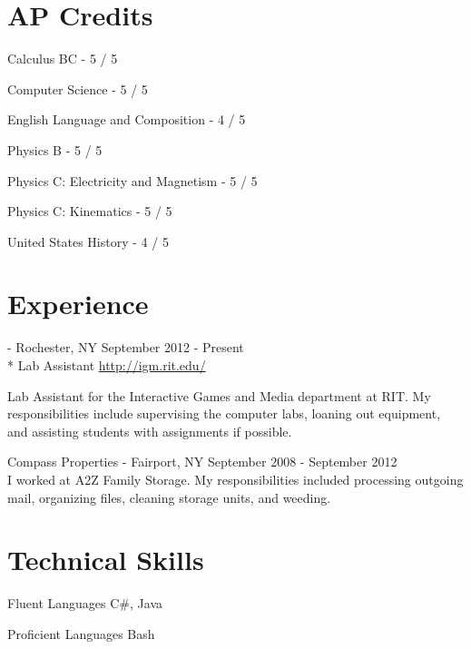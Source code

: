 \documentclass[letterpaper,margin,line,11pt]{resume}
\newcommand{\rurl}[1]{\hfill {\footnotesize \url{#1}}}
\newcommand{\rdate}[1]{\hfill {\small #1}}
\renewcommand{\employer}[5]{\item[#1] - #2 \rdate{#3} \\* #4 \rurl{#5}}
\begin{document}
\begin{resume}
\section{\mysidestyle AP Credits}
        \begin{compactitem}
                \item Calculus BC - {\small 5 / 5}
                \item Computer Science - {\small 5 / 5}
                \item English Language and Composition - {\small 4 / 5}
                \item Physics B - {\small 5 / 5}
                \item Physics C: Electricity and Magnetism - {\small 5 / 5}
                \item Physics C: Kinematics - {\small 5 / 5}
                \item United States History - {\small 4 / 5}
        \end{compactitem}
\section{\mysidestyle Experience}
	\begin{asparadesc}
		\employer{Interactive Games and Media at RIT}{Rochester, NY}{September 2012 - Present}{Lab Assistant}{http://igm.rit.edu/}

		\small
		Lab Assistant for the Interactive Games and Media department at RIT. My responsibilities include supervising the computer labs, loaning out equipment, and assisting students with assignments if possible.
		\normalsize
		\\
		\item[Compass Properties] - Fairport, NY \hfill September 2008 - September 2012 \\
		\small
                I worked at A2Z Family Storage. My responsibilities included processing outgoing mail, organizing files, cleaning storage units, and weeding.
		

	\end{asparadesc}

\section{\mysidestyle Technical Skills}
	\begin{compactdesc}
		\item[Fluent Languages]   \small C\#, Java
		\item[Proficient Languages] \small Bash
	\end{compactdesc}


\end{resume}
\end{document}
